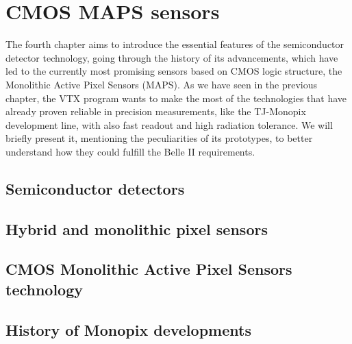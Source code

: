 \chapter{CMOS MAPS sensors} \label{ch:CMOS}

The fourth chapter aims to introduce the essential features of the semiconductor detector technology, going through the history of its advancements, which have led to the currently most promising sensors based on CMOS logic structure, the Monolithic Active Pixel Sensors (MAPS). As we have seen in the previous chapter, the VTX program wants to make the most of the technologies that have already proven reliable in precision measurements, like the TJ-Monopix development line, with also fast readout and high radiation tolerance. We will briefly present it, mentioning the peculiarities of its prototypes, to better understand how they could fulfill the Belle II requirements.


\section{Semiconductor detectors} 




\section{Hybrid and monolithic pixel sensors}


\section{CMOS Monolithic Active Pixel Sensors technology}


\begin{comment}
small fill factor /large fill factor
\end{comment}

\section{History of Monopix developments}





